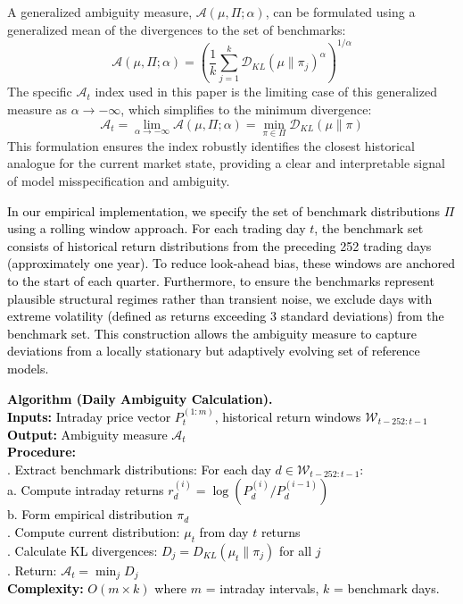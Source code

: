 \documentclass[preprint,12pt,authoryear]{elsarticle}
\begin{document}
A generalized ambiguity measure, $\mathcal{A}(\mu, \Pi; \alpha)$, can be formulated using a generalized mean of the divergences to the set of benchmarks:
\begin{equation}
    \mathcal{A}(\mu, \Pi; \alpha) = \left( \frac{1}{k} \sum_{j=1}^{k} \mathcal{D}_{KL}(\mu \| \pi_j)^{\alpha} \right)^{1/\alpha}
\end{equation}
The specific $\mathcal{A}_t$ index used in this paper is the limiting case of this generalized measure as $\alpha \to -\infty$, which simplifies to the minimum divergence:
\begin{equation}
    \mathcal{A}_t = \lim_{\alpha \to -\infty} \mathcal{A}(\mu, \Pi; \alpha) = \min_{\pi \in \Pi} \mathcal{D}_{KL}(\mu \| \pi)
\end{equation}
This formulation ensures the index robustly identifies the closest historical analogue for the current market state, providing a clear and interpretable signal of model misspecification and ambiguity.

\textcolor{black}{In our empirical implementation, we specify the set of benchmark distributions $\Pi$ using a rolling window approach. For each trading day $t$, the benchmark set consists of historical return distributions from the preceding 252 trading days (approximately one year). To reduce look-ahead bias, these windows are anchored to the start of each quarter. Furthermore, to ensure the benchmarks represent plausible structural regimes rather than transient noise, we exclude days with extreme volatility (defined as returns exceeding 3 standard deviations) from the benchmark set. This construction allows the ambiguity measure to capture deviations from a locally stationary but adaptively evolving set of reference models.}

\vspace{\baselineskip}
\noindent
\textcolor{black}{
\textbf{Algorithm (Daily Ambiguity Calculation).}\\
\textbf{Inputs:} Intraday price vector $P_{t}^{(1:m)}$, historical return windows $\mathcal{W}_{t-252:t-1}$\\
\textbf{Output:} Ambiguity measure $\mathcal{A}_t$\\
\textbf{Procedure:}\\
. Extract benchmark distributions: For each day $d \in \mathcal{W}_{t-252:t-1}$:\\
\indent\indent a. Compute intraday returns $r^{(i)}_d = \log(P^{(i)}_d/P^{(i-1)}_d)$\\
\indent\indent b. Form empirical distribution $\pi_d$\\
. Compute current distribution: $\mu_t$ from day $t$ returns\\
. Calculate KL divergences: $D_j = D_{KL}(\mu_t \| \pi_j)$ for all $j$\\
. Return: $\mathcal{A}_t = \min_j D_j$\\
\textbf{Complexity:} $O(m \times k)$ where $m$ = intraday intervals, $k$ = benchmark days.
}
\end{document}
